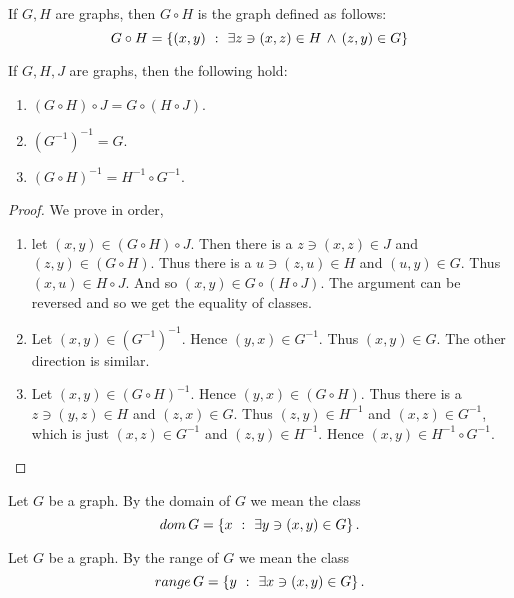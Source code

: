 \begin{Definition}
    If $G,H$ are graphs, then $G \circ H$ is the graph defined as follows:
    \begin{equation*}
	G \circ H = \left\lbrace{(x,y)\hspace{0.05in}}:{\hspace{0.05in}\exists z \ni (x,z) \in H \, \land \, (z,y) \in G} \right\rbrace
    \end{equation*}
\end{Definition}

\begin{Theorem}
    If $G,H,J$ are graphs, then the following hold:
    \begin{enumerate}
	\item $(G \circ H)\circ J = G \circ (H \circ J)$.
	\item ${(G^{-1})}^{-1} = G $.
	\item ${(G \circ H)}^{-1} = H^{-1} \circ G^{-1}$.
    \end{enumerate}
\end{Theorem}
\begin{proof}
    We prove in order,
    \begin{enumerate}
	\item let $(x,y) \in (G \circ H)\circ J$. Then there is a $ z \ni (x,z) \in J$ and 
	    $(z,y) \in (G \circ H) $. Thus there is a $u \ni (z,u) \in H$ and $(u,y) \in G$. Thus $(x,u) \in 
	    H \circ J$. And so $(x,y) \in G \circ (H \circ J)$. The argument can be reversed and 
	    so we get the equality of classes. 
	\item Let $(x,y) \in {(G^{-1})}^{-1}$. Hence $(y,x) \in G^{-1}$. Thus $(x,y) \in G$. The
	    other direction is similar.
	\item Let $(x,y) \in {(G \circ H)}^{-1}$. Hence $(y,x) \in (G \circ H)$. Thus there is a 
	    $z \ni (y,z) \in H$ and $(z,x) \in G$. Thus $(z,y) \in H^{-1}$ and $(x,z) \in G^{-1}$, 
	    which is just $(x,z) \in G^{-1}$ and $(z,y) \in H^{-1}$. Hence 
	    $(x,y) \in H^{-1} \circ G^{-1}$.
    \end{enumerate}
\end{proof}

\begin{Definition}
    Let $G$ be a graph. By the domain of $G$ we mean the class
    \begin{equation*}
	dom\,G = \left\lbrace{x\hspace{0.05in}}:{\hspace{0.05in}\exists y \ni (x,y) \in G} \right\rbrace.
    \end{equation*}
\end{Definition}

\begin{Definition}
    Let $G$ be a graph. By the range of $G$ we mean the class
    \begin{equation*}
	range\,G = \left\lbrace{y\hspace{0.05in}}:{\hspace{0.05in}\exists x \ni (x,y) \in G} \right\rbrace.
    \end{equation*}
\end{Definition}

